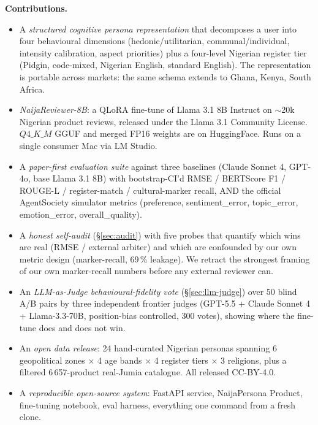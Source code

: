 \documentclass[sigconf,nonacm,balance]{acmart}
\begin{document}
\textbf{Contributions.}
\begin{itemize}[leftmargin=*]
    \item A \emph{structured cognitive persona representation} that decomposes
          a user into four behavioural dimensions (hedonic/utilitarian,
          communal/individual, intensity calibration, aspect priorities) plus
          a four-level Nigerian register tier (Pidgin, code-mixed, Nigerian
          English, standard English). The representation is portable across
          markets: the same schema extends to Ghana, Kenya, South Africa.
    \item \emph{NaijaReviewer-8B}: a QLoRA fine-tune of Llama 3.1 8B Instruct
          on $\sim$20k Nigerian product reviews, released under the Llama 3.1
          Community License. $Q4\_K\_M$ GGUF and merged FP16 weights are on
          HuggingFace. Runs on a single consumer Mac via LM Studio.
    \item A \emph{paper-first evaluation suite} against three baselines
          (Claude Sonnet 4, GPT-4o, base Llama 3.1 8B) with bootstrap-CI'd
          RMSE / BERTScore F1 / ROUGE-L / register-match / cultural-marker
          recall, AND the official AgentSociety simulator metrics
          (\textsf{preference}, \textsf{sentiment\_error},
          \textsf{topic\_error}, \textsf{emotion\_error},
          \textsf{overall\_quality}).
    \item A \emph{honest self-audit} (§\ref{sec:audit}) with five probes
          that quantify which wins are real (RMSE / external arbiter) and
          which are confounded by our own metric design (marker-recall,
          69\,\% leakage). We retract the strongest framing of our own
          marker-recall numbers before any external reviewer can.
    \item An \emph{LLM-as-Judge behavioural-fidelity vote}
          (§\ref{sec:llm-judge}) over 50 blind A/B pairs by three independent
          frontier judges (GPT-5.5 + Claude Sonnet 4 + Llama-3.3-70B,
          position-bias controlled, 300 votes), showing where the fine-tune
          does and does not win.
    \item An \emph{open data release}: 24 hand-curated Nigerian personas
          spanning 6 geopolitical zones $\times$ 4 age bands $\times$ 4 register
          tiers $\times$ 3 religions, plus a filtered 6\,657-product
          real-Jumia catalogue. All released CC-BY-4.0.
    \item A \emph{reproducible open-source system}: FastAPI service,
         NaijaPersona Product, fine-tuning notebook, eval harness,
          everything one command from a fresh clone.
\end{itemize}
\end{document}
